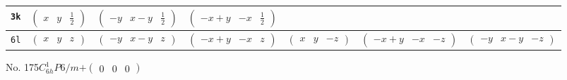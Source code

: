 \documentclass[fleqn,9pt,landscape]{jsarticle}
\begin{document}
\begin{center}
\begin{longtable}{ccccccc}
{\tt 3k} & $ \begin{pmatrix} x & y & \frac{1}{2} \end{pmatrix} $ & $ \begin{pmatrix} - y & x - y & \frac{1}{2} \end{pmatrix} $ & $ \begin{pmatrix} - x + y & - x & \frac{1}{2} \end{pmatrix} $ & $  $ & $  $ & $  $ \\ \hline
{\tt 6l} & $ \begin{pmatrix} x & y & z \end{pmatrix} $ & $ \begin{pmatrix} - y & x - y & z \end{pmatrix} $ & $ \begin{pmatrix} - x + y & - x & z \end{pmatrix} $ & $ \begin{pmatrix} x & y & - z \end{pmatrix} $ & $ \begin{pmatrix} - x + y & - x & - z \end{pmatrix} $ & $ \begin{pmatrix} - y & x - y & - z \end{pmatrix} $ \\
\end{longtable}
\end{center}
\newpage
No. 175\quad$C_{6h}^{1}$\quad$P6/m$\quad[ hexagonal ]\quad$+\begin{pmatrix} 0 & 0 & 0 \end{pmatrix}$
\end{document}
